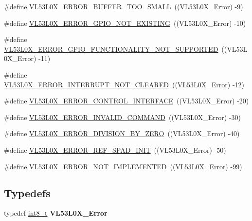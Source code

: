 \begin{DoxyCompactItemize}
\item 
\#define \hyperlink{group__VL53L0X__define__Error__group_gad0318b9ad0104dc41f5a661e3a6bb4bf}{V\+L53\+L0\+X\+\_\+\+E\+R\+R\+O\+R\+\_\+\+B\+U\+F\+F\+E\+R\+\_\+\+T\+O\+O\+\_\+\+S\+M\+A\+LL}~((V\+L53\+L0\+X\+\_\+\+Error) -\/9)
\item 
\#define \hyperlink{group__VL53L0X__define__Error__group_ga4c79eeda9219432ccf8de727953f4c22}{V\+L53\+L0\+X\+\_\+\+E\+R\+R\+O\+R\+\_\+\+G\+P\+I\+O\+\_\+\+N\+O\+T\+\_\+\+E\+X\+I\+S\+T\+I\+NG}~((V\+L53\+L0\+X\+\_\+\+Error) -\/10)
\item 
\#define \hyperlink{group__VL53L0X__define__Error__group_ga9fa1d66f2d200b7d81bc76df22f661b4}{V\+L53\+L0\+X\+\_\+\+E\+R\+R\+O\+R\+\_\+\+G\+P\+I\+O\+\_\+\+F\+U\+N\+C\+T\+I\+O\+N\+A\+L\+I\+T\+Y\+\_\+\+N\+O\+T\+\_\+\+S\+U\+P\+P\+O\+R\+T\+ED}~((V\+L53\+L0\+X\+\_\+\+Error) -\/11)
\item 
\#define \hyperlink{group__VL53L0X__define__Error__group_gab5679ba3df76cb304f7ea8f8e637c818}{V\+L53\+L0\+X\+\_\+\+E\+R\+R\+O\+R\+\_\+\+I\+N\+T\+E\+R\+R\+U\+P\+T\+\_\+\+N\+O\+T\+\_\+\+C\+L\+E\+A\+R\+ED}~((V\+L53\+L0\+X\+\_\+\+Error) -\/12)
\item 
\#define \hyperlink{group__VL53L0X__define__Error__group_gab1b8ae57984f4dbbfd2a4ad33656de9f}{V\+L53\+L0\+X\+\_\+\+E\+R\+R\+O\+R\+\_\+\+C\+O\+N\+T\+R\+O\+L\+\_\+\+I\+N\+T\+E\+R\+F\+A\+CE}~((V\+L53\+L0\+X\+\_\+\+Error) -\/20)
\item 
\#define \hyperlink{group__VL53L0X__define__Error__group_gaf6f072f9026fc93f6183320081eb0aec}{V\+L53\+L0\+X\+\_\+\+E\+R\+R\+O\+R\+\_\+\+I\+N\+V\+A\+L\+I\+D\+\_\+\+C\+O\+M\+M\+A\+ND}~((V\+L53\+L0\+X\+\_\+\+Error) -\/30)
\item 
\#define \hyperlink{group__VL53L0X__define__Error__group_ga000c76b4964dea1fe556d63271a5af3c}{V\+L53\+L0\+X\+\_\+\+E\+R\+R\+O\+R\+\_\+\+D\+I\+V\+I\+S\+I\+O\+N\+\_\+\+B\+Y\+\_\+\+Z\+E\+RO}~((V\+L53\+L0\+X\+\_\+\+Error) -\/40)
\item 
\#define \hyperlink{group__VL53L0X__define__Error__group_gaa87a7958ab510c391f0f9e744871f91b}{V\+L53\+L0\+X\+\_\+\+E\+R\+R\+O\+R\+\_\+\+R\+E\+F\+\_\+\+S\+P\+A\+D\+\_\+\+I\+N\+IT}~((V\+L53\+L0\+X\+\_\+\+Error) -\/50)
\item 
\#define \hyperlink{group__VL53L0X__define__Error__group_ga46f8eb3c947b3bbcef6d15d2e05169fa}{V\+L53\+L0\+X\+\_\+\+E\+R\+R\+O\+R\+\_\+\+N\+O\+T\+\_\+\+I\+M\+P\+L\+E\+M\+E\+N\+T\+ED}~((V\+L53\+L0\+X\+\_\+\+Error) -\/99)
\end{DoxyCompactItemize}
\subsection*{Typedefs}
\begin{DoxyCompactItemize}
\item 
\mbox{\label{group__VL53L0X__define__Error__group_ga7d66c5df3ebc4b0bde0327989c0f8b04}} 
typedef \hyperlink{vl53l0x__types_8h_aef44329758059c91c76d334e8fc09700}{int8\+\_\+t} {\bfseries V\+L53\+L0\+X\+\_\+\+Error}
\end{DoxyCompactItemize}


